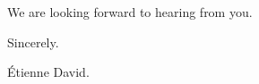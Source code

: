 \documentclass[1p]{elsarticle}
\begin{document}
\medskip


We are looking forward to hearing from you.

\medskip

\indent Sincerely.

\medskip

\'Etienne David.
\end{document}
